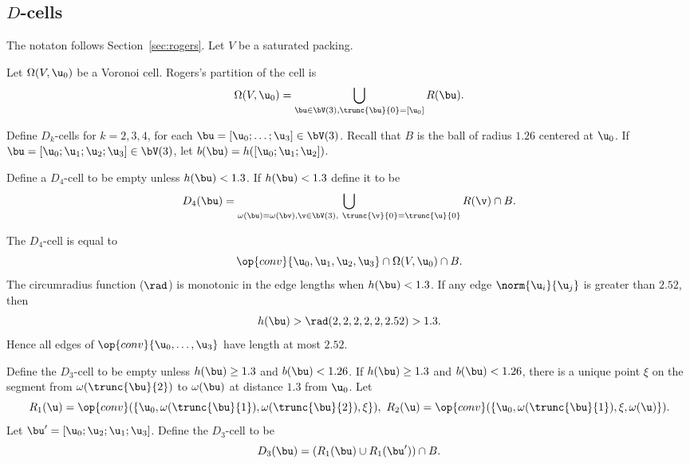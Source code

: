 \subsection{$D$-cells}



The notaton follows Section~\ref{sec:rogers}.  Let $V$ be a saturated
packing.

Let $\Omega( V,\u_0)$ be a Voronoi cell.  Rogers's partition of the cell
is
\begin{displaymath}
\Omega(V, \u_0) = \bigcup_{ \bu\in  \bV(3), \trunc{\bu}{0}= [\u_0] } R( \bu).
\end{displaymath}
%
%


Define $D_k$-cells for $k=2,3,4$, for each $ \bu=[\u_0;\ldots;\u_3]\in
\bV(3)$.  Recall that $B$ is the ball of radius $1.26$ centered at $
\u_0$.  If $\bu =[\u_0;\u_1;\u_2;\u_3]\in \bV(3)$, let $b(\bu) = h([
\u_0; \u_1; \u_2])$.  %
%

\begin{definition}[$D_4$]
  Define a $D_4$-cell to be empty unless $h(\bu)<1.3$.  If
  $h(\bu)<1.3$ define it to be
\begin{displaymath}
  D_4(\bu)=\bigcup_{\omega( \bu)
=\omega(\bv),  \v\in  \bV(3),\ \trunc{\v}{0}= \trunc{\u}{0}}  R(\v)\cap B.
\end{displaymath}
%
\end{definition}

The $D_4$-cell is equal to
\begin{displaymath}
  \op{conv}\{ \u_0, \u_1, \u_2, \u_3\} \cap \Omega(V, \u_0)\cap B.
\end{displaymath}
The circumradius function ($\rad$) is monotonic in the edge lengths
when $h(\bu)<1.3$.  If any edge $\norm{ \u_i}{ \u_j}$ is greater than
$2.52$, then
\begin{displaymath}
h(\bu) > \rad(2,2,2,2,2,2.52) > 1.3.
\end{displaymath}  
Hence all edges of $\op{conv}\{\u_0,\ldots,\u_3\}$ have length at most
$2.52$.

\begin{definition}[$D_3$]
  Define the $D_3$-cell to be empty unless $h(\bu)\ge 1.3$ and
  $b(\bu)< 1.26$.  If $h(\bu) \ge 1.3$ and $b(\bu)< 1.26$, there is a
  unique point $\xi$ on the segment from $\omega( \trunc{\bu}{2})$ to
  $\omega(\bu)$ at distance $1.3$ from $ \u_0$.  Let
\begin{displaymath}
  R_1( \u) = \op{conv}(\{ \u_0,\omega( \trunc{\bu}{1}),\omega( \trunc{\bu}{2}),\xi\} ),\ 
  R_2( \u) = \op{conv}(\{ \u_0,\omega( \trunc{\bu}{1}),\xi,\omega( \u)\} ).
\end{displaymath}
Let $ \bu' = [ \u_0; \u_2; \u_1; \u_3]$.
Define the $D_3$-cell to be
\begin{displaymath}
D_3(\bu) = (R_1( \bu) \cup R_1( \bu'))\cap B.
\end{displaymath}
\end{definition}

